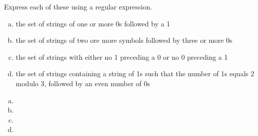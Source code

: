 \documentclass[../main.tex]{subfiles}
\begin{document}
Express each of these using a regular expression.
\begin{enumerate}[a)]
	\item the set of strings of one or more 0s followed by a 1
	\item the set of strings of two ore more symbols followed by three or more 0s
	\item the set of strings with either no 1 preceding a 0 or no 0 preceding a 1
	\item the set of strings containing a string of 1s such that the number of 1s equals 2 modulo 3, followed by an even number of 0s
\end{enumerate}

\solution
\begin{enumerate}[a)]
	\item 
	\item 
	\item 
	\item 
\end{enumerate}
\end{document}

